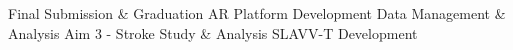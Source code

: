 {\begin{tabularx}{\linewidth}{|l!{\vrule width \myLenLineThicknessThick}*{7}{@{}X@{}|}}
       & 
    
      
      
       & 
    
      
      
       & 
    
      
      
       & 
    
      
      
       & 
    
      
      
       & 
    
      
      
      
        \\  \hline 
      
    
  
  
  \end{tabularx}
}
\vfill{\centering{} \small{Final Submission \& Graduation}\hspace{ 1.5em } \small{AR Platform Development}\hspace{ 1.5em } \small{Data Management \& Analysis}\hspace{ 1.5em } \small{Aim 3 - Stroke Study \& Analysis}\hspace{ 1.5em } \small{SLAVV-T Development}\hspace{ 1.5em }\par}

